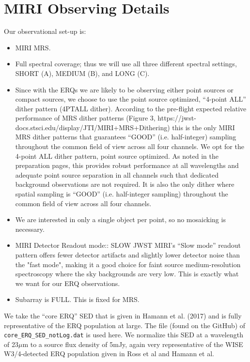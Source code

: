 \section*{MIRI Observing Details}
Our observational set-up is:
\begin{itemize}
    \item MIRI MRS.  

    \item Full spectral coverage; thus we will use all three different spectral settings, SHORT (A), MEDIUM (B), and LONG (C).  

    \item Since with the ERQs we are likely to be observing
      either point sources or compact sources, we choose to use the point
      source optimized, ``4-point ALL'' dither pattern (4PTALL
      dither). According to the pre-flight expected relative performance of
      MRS dither patterns (Figure 3,
      https://jwst-docs.stsci.edu/display/JTI/MIRI+MRS+Dithering) this is
      the only MIRI MRS dither patterns that guarantees ``GOOD''
      (i.e. half-integer) sampling throughout the common field of view
      across all four channels.
        We opt for the 4-point ALL dither pattern, point source
        optimized.  As noted in the preparation pages, this provides robust
        performance at all wavelengths and adequate point source separation in
        all channels such that dedicated background observations are not
        required. It is also the only dither where spatial sampling is ``GOOD''
        (i.e. half-integer sampling) throughout the common field of view
        across all four channels.

    \item We are interested in only a single object per point, so no mosaicking is necessary.  

    \item{MIRI Detector Readout mode:: SLOW 
        JWST MIRI's ``Slow mode'' readout pattern offers fewer detector
        artifacts and slightly lower detector noise than the "fast mode",
        making it a good choice for faint source medium-resolution
        spectroscopy where the sky backgrounds are very low. This is 
        exactly what we want for our ERQ observations.}

    \item{Subarray is FULL. This is fixed for MRS.}

\end{itemize}


\smallskip \smallskip 
\noindent
We take the ``core ERQ'' SED that is given in Hamann et al. (2017) and
is fully representative of the ERQ population at large.  The file
(found on the GitHub) of {\tt core\_ERQ\_SED\_notLog.dat} is used
here.  We normalize this SED at a wavelength of 23$\mu$m to a source
flux density of 5mJy, again very representative of the WISE
W3/4-detected ERQ population given in Ross et al and Hamann et al.


